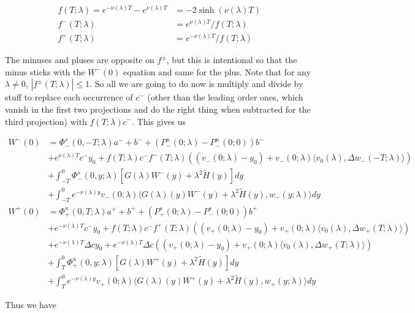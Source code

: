 \documentclass[12pt]{article}
\begin{document}
\begin{enumerate}
\begin{align*}
f(T; \lambda) = e^{-\nu(\lambda)T} - e^{\nu(\lambda)T} &= -2 \sinh (\nu(\lambda) T) \\
f^-(T; \lambda) &= e^{\nu(\lambda)T} / f(T; \lambda) \\
f^+(T; \lambda) &= e^{-\nu(\lambda)T} / f(T; \lambda)
\end{align*}

The minuses and pluses are opposite on $f^\pm$, but this is intentional so that the minus sticks with the $W^-(0)$ equation and same for the plus. Note that for any $\lambda \neq 0$, $|f^\pm(T; \lambda)| \leq 1$. So all we are going to do now is multiply and divide by stuff to replace each occurrence of $c^-$ (other than the leading order ones, which vanish in the first two projections and do the right thing when subtracted for the third projection) with $f(T; \lambda) c^-$. This gives us

\begin{align*}
W^-(0) &= \Phi^s_-(0, -T; \lambda )a^- + b^- + (P^u_-(0; \lambda) - P^u_-(0; 0))b^- \\
&+ e^{\nu(\lambda)T} c^- y_0 + f(T; \lambda) c^- f^-(T; \lambda) ( (v_-(0; \lambda) - y_0) + v_-(0; \lambda) \langle  v_0(\lambda), \Delta w_-(-T; \lambda) \rangle) \\
&+ \int_{-T}^0 \Phi^s_-(0, y; \lambda) [ G(\lambda)W^-(y) + \lambda^2 \tilde{H}(y) ] dy \\
&+ \int_{-T}^0 
e^{-\nu(\lambda)y} v_-(0; \lambda) \langle G(\lambda)(y)W^-(y) + \lambda^2 \tilde{H}(y), w_-(y; \lambda) \rangle dy \\
W^+(0) &= \Phi^u_+(0, T; \lambda)a^+ + b^+ + (P^s_+(0; \lambda) - P^s_-(0; 0))b^+ \\
&+ e^{-\nu(\lambda)T} c^- y_0 + f(T; \lambda) c^- f^+(T; \lambda) ( (v_+(0; \lambda) - y_0) + v_+(0; \lambda) \langle  v_0(\lambda), \Delta w_+(T; \lambda) \rangle) \\
&+ e^{-\nu(\lambda)T} \Delta c y_0 + e^{-\nu(\lambda)T} \Delta c ( (v_+(0; \lambda) - y_0) + v_+(0; \lambda) \langle  v_0(\lambda), \Delta w_+(T; \lambda) \rangle) \\
&+ \int_T^0 \Phi^u_+(0, y; \lambda) [ G(\lambda)W^+(y) + \lambda^2 \tilde{H}(y) ] dy \\
&+ \int_T^0 e^{-\nu(\lambda)y} v_+(0; \lambda) \langle G(\lambda)(y)W^+(y) + \lambda^2 \tilde{H}(y), w_+(y; \lambda) \rangle dy
\end{align*}

Thus we have


\end{enumerate}
\end{document}
